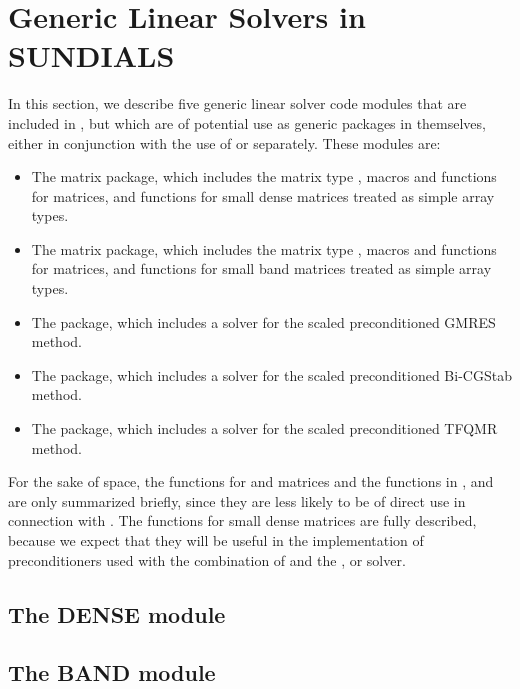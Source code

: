 \chapter{Generic Linear Solvers in SUNDIALS}\label{s:gen_linsolv}
In this section, we describe five generic linear solver code modules that 
are included in {\ida}, but which are of potential use as generic packages in
themselves, either in conjunction with the use of {\ida} or separately.
These modules are:
\begin{itemize}
\item The {\dense} matrix package, which includes the matrix type ,
      macros and functions for  matrices, and functions
      for small dense matrices treated as simple array types.
\item The {\band} matrix package, which includes the matrix type ,
      macros and functions for  matrices, and functions
      for small band matrices treated as simple array types.
\item The {\spgmr} package, which includes a solver for the scaled
      preconditioned GMRES method.
\item The {\spbcg} package, which includes a solver for the scaled
      preconditioned Bi-CGStab method.
\item The {\sptfqmr} package, which includes a solver for the scaled
      preconditioned TFQMR method.
\end{itemize}

For the sake of space, the functions for  and
 matrices and the functions in {\spgmr}, {\spbcg} and {\sptfqmr}
are only summarized briefly, since they are less likely to be of direct use
in connection with {\ida}.  The functions for small dense matrices are fully
described, because we expect that they will be useful in the
implementation of preconditioners used with the combination of {\ida}
and the {\idaspgmr}, {\idaspbcg} or {\idasptfqmr} solver.

\section{The DENSE module}\label{ss:dense}


\section{The BAND module}\label{ss:band}


